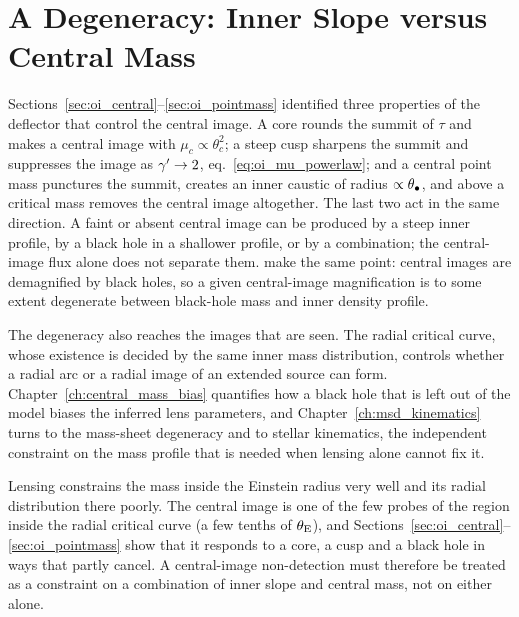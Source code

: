 \section{A Degeneracy: Inner Slope versus Central Mass}
\label{sec:oi_degeneracy}

Sections~\ref{sec:oi_central}--\ref{sec:oi_pointmass} identified three
properties of the deflector that control the central image.  A core
rounds the summit of $\tau$ and makes a central image with
$\mu_c\propto\theta_c^2$; a steep cusp sharpens the summit and
suppresses the image as $\gamma'\to2$, eq.~\eqref{eq:oi_mu_powerlaw}; and a
central point mass punctures the summit, creates an inner caustic of
radius $\propto\theta_{\bullet}$, and above a critical mass removes the central
image altogether.
The last two act in the same direction.  A faint or absent central
image can be produced by a steep inner profile, by a black hole in a
shallower profile, or by a combination; the central-image flux alone
does not separate them.
\citet[][Sect.~6.2.2]{congdon_principles_2018} make the same point:
central images are demagnified by black holes, so a given central-image
magnification is to some extent degenerate between black-hole mass and
inner density profile.

The degeneracy also reaches the images that are seen.  The radial
critical curve, whose existence is decided by the same inner mass
distribution, controls whether a radial arc or a radial image of an
extended source can form.  Chapter~\ref{ch:central_mass_bias}
quantifies how a black hole that is left out of the model biases the
inferred lens parameters, and Chapter~\ref{ch:msd_kinematics} turns to
the mass-sheet degeneracy and to stellar kinematics, the independent
constraint on the mass profile that is needed when lensing alone cannot
fix it.

\begin{annotation}
Lensing constrains the mass inside the Einstein radius very well
and its radial distribution there poorly.  The central image is one of
the few probes of the region inside the radial critical curve (a
few tenths of $\theta_{\mathrm{E}}$), and
Sections~\ref{sec:oi_central}--\ref{sec:oi_pointmass} show that it
responds to a core, a cusp and a black hole in ways that partly cancel.
A central-image non-detection must therefore be treated as a constraint
on a combination of inner slope and central mass, not on either alone.
\end{annotation}


